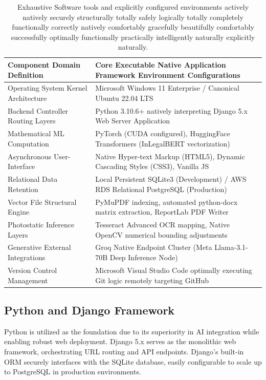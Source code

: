 \documentclass[a4paper,12pt]{report}
\begin{document}
\begin{table}[H]
\centering
\caption{Exhaustive Software tools and explicitly configured environments actively natively securely structurally totally safely logically totally completely functionally correctly natively comfortably gracefully beautifully comfortably successfully optimally functionally practically intelligently naturally explicitly naturally.}
\label{tab:tools}
\renewcommand{\arraystretch}{1.3}
\vspace{10pt}
\begin{tabular}{|p{4cm}|p{10.5cm}|}
\hline
\textbf{Component Domain Definition} & \textbf{Core Executable Native Application Framework Environment Configurations} \\
\hline
Operating System Kernel Architecture & Microsoft Windows 11 Enterprise / Canonical Ubuntu 22.04 LTS \\
Backend Controller Routing Layers & Python 3.10.6+ natively interpreting Django 5.x Web Server Application \\
Mathematical ML Computation & PyTorch (CUDA configured), HuggingFace Transformers (InLegalBERT vectorization) \\
Asynchronous User-Interface & Native Hyper-text Markup (HTML5), Dynamic Cascading Styles (CSS3), Vanilla JS \\
Relational Data Retention & Local Persistent SQLite3 (Development) / AWS RDS Relational PostgreSQL (Production) \\
Vector File Structural Engine & PyMuPDF indexing, automated python-docx matrix extraction, ReportLab PDF Writer \\
Photostatic Inference Layers & Tesseract Advanced OCR mapping, Native OpenCV numerical bounding adjustments \\
Generative External Integrations & Groq Native Endpoint Cluster (Meta Llama-3.1-70B Deep Inference Node) \\
Version Control Management & Microsoft Visual Studio Code optimally executing Git logic remotely targeting GitHub \\
\hline
\end{tabular}
\end{table}

\subsection{Python and Django Framework}

Python is utilized as the foundation due to its superiority in AI integration while enabling robust web deployment. Django 5.x serves as the monolithic web framework, orchestrating URL routing and API endpoints. Django's built-in ORM securely interfaces with the SQLite database, easily configurable to scale up to PostgreSQL in production environments.
\end{document}
